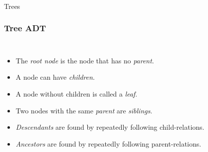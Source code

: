 \begin{frame}[fragile]\frametitle{}
\begin{center}
{\Large Trees}
\end{center}

\end{frame}

\begin{frame}
	\frametitle{Tree ADT}
	\begin{columns}[T]
		\begin{itemize}
			\item The \textit{root node} is the node that has no \textit{parent}.
				
			\item A node can have \textit{children}.
				
			\item A node without children is called a \textit{leaf}.
				
			\item Two nodes with the same \textit{parent} are \textit{siblings}.
				
			\item \textit{Descendants} are found by repeatedly following child-relations.
				
			\item \textit{Ancestors} are found by repeatedly following parent-relations.
		\end{itemize}
	\end{columns}
\end{frame}


